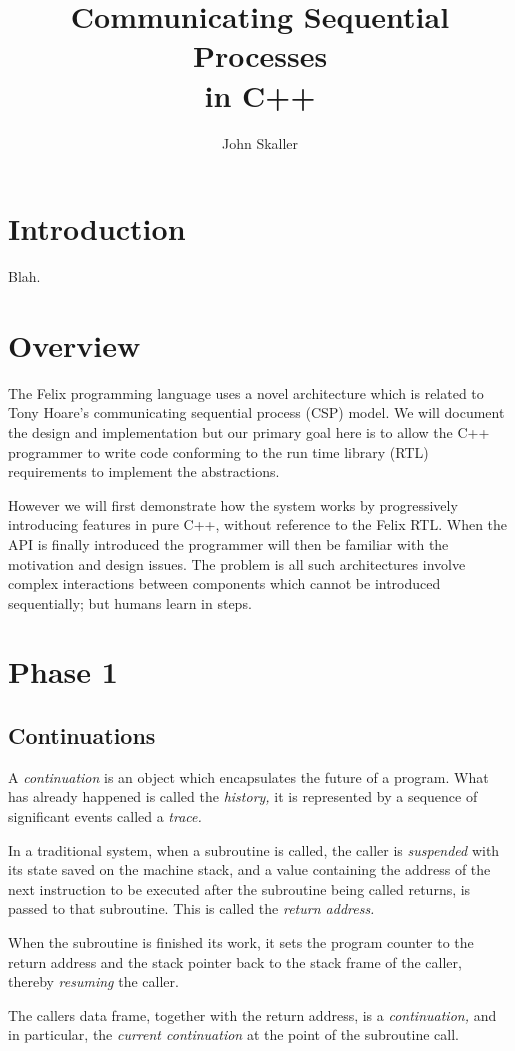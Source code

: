 \documentclass[oneside]{book}
\title{Communicating Sequential Processes\\ in C++}
\author{John Skaller}
\begin{document}
\maketitle
\tableofcontents
\chapter{Introduction}
Blah.
\chapter{Overview}
The Felix programming language uses a novel architecture which is related to
Tony Hoare's communicating sequential process (CSP) model. We will document
the design and implementation but our primary goal here is to allow the
C++ programmer to write code conforming to the run time library (RTL) requirements
to implement the abstractions.

However we will first demonstrate how the system works by progressively
introducing features in pure C++, without reference to the Felix RTL.
When the API is finally introduced the programmer will then be familiar
with the motivation and design issues. The problem is all such architectures
involve complex interactions between components which cannot be introduced
sequentially; but humans learn in steps.

\chapter{Phase 1}
\section{Continuations}
A {\em continuation} is an object which encapsulates the future of a program.
What has already happened is called the {\em history,} it is represented by a sequence
of significant events called a {\em trace.}

In a traditional system, when a subroutine is called, the caller is {\em suspended}
with its state saved on the machine stack, and a value containing the address
of the next instruction to be executed after the subroutine being called
returns, is passed to that subroutine. This is called the {\em return address.}

When the subroutine is finished its work, it sets the program counter
to the return address and the stack pointer back to the stack frame of the
caller, thereby {\em resuming} the caller.

The callers data frame, together with the return address, is a {\em continuation,}
and in particular, the {\em current continuation} at the point of the subroutine 
call. 
\end{document}
